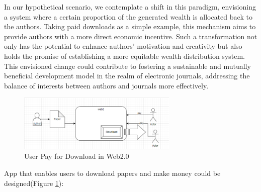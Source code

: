 \documentclass[lettersize,journal]{IEEEtran}
\begin{document}
In our hypothetical scenario, we contemplate a shift in this paradigm, envisioning a system where a certain proportion of the generated wealth is allocated back to the authors. Taking paid downloads as a simple example, this mechanism aims to provide authors with a more direct economic incentive. Such a transformation not only has the potential to enhance authors' motivation and creativity but also holds the promise of establishing a more equitable wealth distribution system. This envisioned change could contribute to fostering a sustainable and mutually beneficial development model in the realm of electronic journals, addressing the balance of interests between authors and journals more effectively.

\begin{figure}[h]
  \includegraphics[width=3in]{assets/web2.png}
  \caption{User Pay for Download in Web2.0}
  \label{fig:web2}
\end{figure}

App that enables users to download papers and make money could be designed(Figure \ref{fig:web2}):
\end{document}
